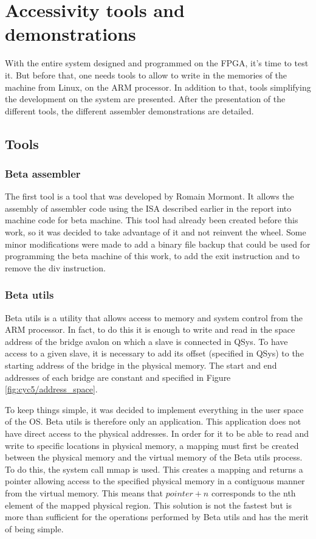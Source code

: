 \chapter{Accessivity tools and demonstrations}

With the entire system designed and programmed on the FPGA, it's time to test it. But before that, 
one needs tools to allow to write in the memories of the machine from Linux, on the ARM processor. 
In addition to that, tools simplifying the development on the system are presented. After the 
presentation of the different tools, the different assembler demonstrations are detailed.

\section{Tools}

\subsection{Beta assembler}

The first tool is a tool that was developed by Romain Mormont. It allows the assembly of assembler 
code using the ISA described earlier in the report into machine code for beta machine. This tool 
had already been created before this work, so it was decided to take advantage of it and not 
reinvent the wheel. Some minor modifications were made to add a binary file backup that could be 
used for programming the beta machine of this work, to add the exit instruction and to remove the 
div instruction.

\subsection{Beta utils}

Beta utils is a utility that allows access to memory and system control from the ARM processor. In 
fact, to do this it is enough to write and read in the space address of the bridge avalon on which
a slave is connected in QSys. To have access to a given slave, it is necessary to add its offset 
(specified in QSys) to the starting address of the bridge in the physical memory. The start and end 
addresses of each bridge are constant and specified in Figure \ref{fig:cyc5/address_space}. 

To keep things simple, it was decided to implement everything in the user space of the OS. Beta 
utils is therefore only an application. This application does not have direct access to the 
physical addresses. In order for it to be able to read and write to specific locations in physical 
memory, a mapping must first be created between the physical memory and the virtual memory of the 
Beta utils process. To do this, the system call mmap is used. This creates a mapping and returns a 
pointer allowing access to the specified physical memory in a contiguous manner from the virtual 
memory. This means that $pointer + n$ corresponds to the nth element of the mapped physical region. 
This solution is not the fastest but is more than sufficient for the operations performed by Beta 
utils and has the merit of being simple. 

